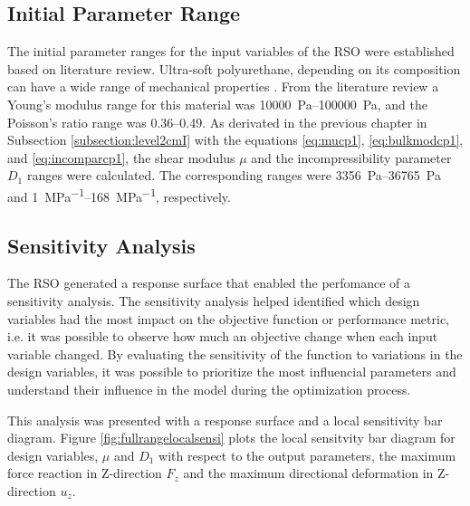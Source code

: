 \subsection*{Initial Parameter Range}
The initial parameter ranges for the input variables of the RSO were established based on literature review.
Ultra-soft polyurethane, depending on its composition can have a wide range of mechanical properties \cite{Wendels2021}.
From the literature review a Young's modulus range for this material was \SIrange{10000}{100000}{\pascal}, and the 
Poisson's ratio range was \SIrange{0.36}{0.49}{}. As derivated in the previous chapter in 
Subsection \ref{subsection:level2cmI} with the equations \ref{eq:mucp1}, \ref{eq:bulkmodcp1}, 
and \ref{eq:incomparcp1}, the shear modulus $\mu$ and the incompressibility parameter $D_1$ ranges were calculated.
The corresponding ranges were \SIrange{3356}{36765}{\pascal} and \SIrange{1}{168}{\mega\pascal\tothe{-1}}, respectively.

\subsection*{Sensitivity Analysis}
The RSO generated a response surface that enabled the perfomance of a sensitivity analysis.
The sensitivity analysis helped identified which design variables had the most impact 
on the objective function or performance metric, i.e. it was possible to observe how much 
an objective change when each input variable changed. By evaluating the sensitivity of the 
function to variations in the design variables, it was possible to prioritize the most 
influencial parameters and understand their influence in the model during the optimization 
process.

This analysis was presented with a response surface and a local sensitivity bar diagram. 
Figure \ref{fig:fullrangelocalsensi} plots the local sensitvity bar diagram for design variables,
$\mu$ and $D_1$ with respect to the output parameters, the maximum force reaction in Z-direction $F_z$ 
and the maximum directional deformation in Z-direction $u_z$. 

